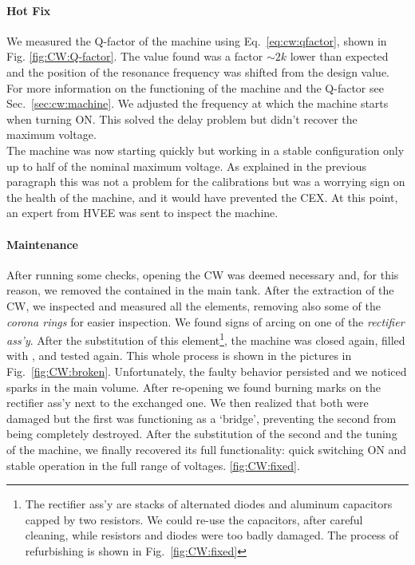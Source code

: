 \begin{refsection}
        \paragraph{Hot Fix}
        We measured the Q-factor of the machine using Eq.~\ref{eq:cw:qfactor}, shown in Fig. \ref{fig:CW:Q-factor}.  
        The value found was a factor $\sim2k$ lower than expected and the position of the resonance frequency was shifted from the design value.
        For more information on the functioning of the machine and the Q-factor see Sec.~\ref{sec:cw:machine}.
        We adjusted the frequency at which the machine starts when turning ON. 
        This solved the delay problem but didn't recover the maximum voltage. \\
        The machine was now starting quickly but working in a stable configuration only up to half of the nominal maximum voltage.
        As explained in the previous paragraph this was not a problem for the  calibrations but was a worrying sign on the health of the machine, and it would have prevented the CEX.
        At this point, an expert from HVEE was sent to inspect the machine.

        \paragraph{Maintenance}
        After running some checks, opening the CW was deemed necessary and, for this reason, we removed the  contained in the main tank. 
        After the extraction of the CW, we inspected and measured all the elements, removing also some of the \textit{corona rings} for easier inspection. 
        We found signs of arcing on one of the \textit{rectifier ass'y}. 
        After the substitution of this element\footnote{The rectifier ass'y are stacks of alternated diodes and aluminum capacitors capped by two resistors. We could re-use the capacitors, after careful cleaning, while resistors and diodes were too badly damaged. The process of refurbishing is shown in Fig.~\ref{fig:CW:fixed}}, the machine was closed again, filled with , and tested again.
        This whole process is shown in the pictures in Fig.~\ref{fig:CW:broken}.
        Unfortunately, the faulty behavior persisted and we noticed sparks in the main volume. 
        After re-opening we found burning marks on the rectifier ass'y next to the exchanged one.
        We then realized that both were damaged but the first was functioning as a `bridge', preventing the second from being completely destroyed. 
        After the substitution of the second and the tuning of the machine, we finally recovered its full functionality: quick switching ON and stable operation in the full range of voltages.
        \ref{fig:CW:fixed}.


\end{refsection}
